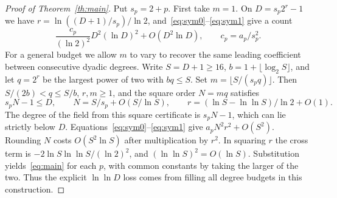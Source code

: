 \begin{proof}[Proof of Theorem~\ref{th:main}]
Put \(s_p=2+p\). First take \(m=1\). On \(D=s_p2^r-1\) we have \(r=\ln((D+1)/s_p)/\ln 2\), and~\eqref{eq:sym0}--\eqref{eq:sym1} give a count
\[
 \frac{c_p}{(\ln 2)^2}D^2(\ln D)^2+O(D^2\ln D),\qquad c_p=a_p/s_p^2 .
\]
For a general budget we allow \(m\) to vary to recover the same leading coefficient between consecutive dyadic degrees. Write \(S=D+1\ge16\), \(b=1+\lfloor\log_2 S\rfloor\), and let \(q=2^r\) be the largest power of two with \(bq\le S\). Set \(m=\lfloor S/(s_pq)\rfloor\). Then \(S/(2b)<q\le S/b\), \(r,m\ge1\), and the square order \(N=mq\) satisfies
\[
 s_pN-1\le D,\qquad N=S/s_p+O(S/\ln S),\qquad
 r=(\ln S-\ln\ln S)/\ln 2+O(1).
\]
The degree of the field from this square certificate is \(s_pN-1\), which can lie strictly below \(D\). Equations~\eqref{eq:sym0}--\eqref{eq:sym1} give \(a_pN^2r^2+O(S^2)\). Rounding \(N\) costs \(O(S^2\ln S)\) after multiplication by \(r^2\). In squaring \(r\) the cross term is \(-2\ln S\ln\ln S/(\ln 2)^2\), and \((\ln\ln S)^2=O(\ln S)\). Substitution yields~\eqref{eq:main} for each \(p\), with common constants by taking the larger of the two. Thus the explicit \(\ln\ln D\) loss comes from filling all degree budgets in this construction.
\end{proof}
